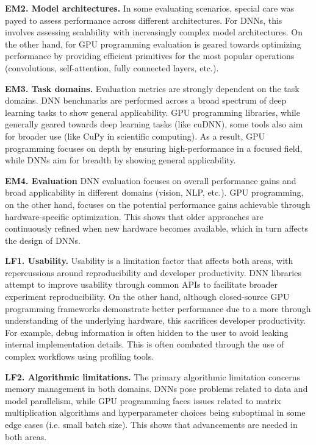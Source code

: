 \textbf{EM2. Model architectures.}
In some evaluating scenarios, special care was payed to assess performance across different architectures.
For DNNs, this involves assessing scalability with increasingly complex model architectures. On the other hand,
for GPU programming evaluation is geared towards optimizing performance by providing efficient primitives
for the most popular operations (convolutions, self-attention, fully connected layers, etc.).

\textbf{EM3. Task domains.}
Evaluation metrics are strongly dependent on the task domains. DNN benchmarks are performed across
a broad spectrum of deep learning tasks to show general applicability. GPU programming libraries,
while generally geared towards deep learning tasks (like cuDNN), some tools also aim for broader
use (like CuPy in scientific computing). As a result, GPU programming focuses on depth by ensuring
high-performance in a focused field, while DNNs aim for breadth by showing general applicability.

\textbf{EM4. Evaluation}
DNN evaluation focuses on overall performance gains and broad applicability in different domains (vision,
NLP, etc.). GPU programming, on the other hand, focuses on the potential performance gains achievable through
hardware-specific optimization. This shows that older approaches are continuously refined when new hardware
becomes available, which in turn affects the design of DNNs.

\textbf{LF1. Usability.}
Usability is a limitation factor that affects both areas, with repercussions around reproducibility and developer
productivity. DNN libraries attempt to improve usability through common APIs to facilitate broader
experiment reproducibility. On the other hand, although closed-source GPU programming frameworks
demonstrate better performance due to a more through understanding of the underlying hardware, this sacrifices
developer productivity. For example, debug information is often hidden to the user to avoid leaking
internal implementation details. This is often combated through the use of complex workflows using
profiling tools.

\textbf{LF2. Algorithmic limitations.}
The primary algorithmic limitation concerns memory management in both domains.
DNNs pose problems related to data and model parallelism, while GPU programming faces issues
related to matrix multiplication algorithms and hyperparameter choices being suboptimal in some edge cases
(i.e. small batch size). This shows that advancements are needed in both areas.

